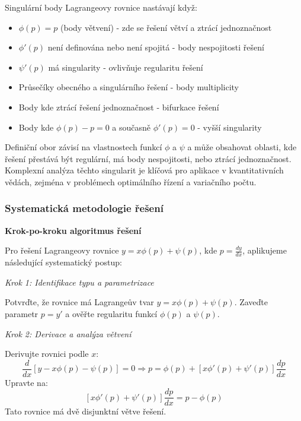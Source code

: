 Singulární body Lagrangeovy rovnice nastávají když:
\begin{itemize}
\item $\phi(p) = p$ (body větvení) - zde se řešení větví a ztrácí jednoznačnost
\item $\phi'(p)$ není definována nebo není spojitá - body nespojitosti řešení
\item $\psi'(p)$ má singularity - ovlivňuje regularitu řešení
\item Průsečíky obecného a singulárního řešení - body multiplicity
\item Body kde ztrácí řešení jednoznačnost - bifurkace řešení
\item Body kde $\phi(p) - p = 0$ a současně $\phi'(p) = 0$ - vyšší singularity
\end{itemize}

Definiční obor závisí na vlastnostech funkcí $\phi$ a $\psi$ a může obsahovat oblasti, kde řešení přestává být regulární, má body nespojitosti, nebo ztrácí jednoznačnost. Komplexní analýza těchto singularit je klíčová pro aplikace v kvantitativních vědách, zejména v problémech optimálního řízení a variačního počtu.

\subsubsection{Systematická metodologie řešení}
\label{subsubsec:metodologie-reseni-lagrange}

\noindent\textbf{Krok-po-kroku algoritmus řešení}

Pro řešení Lagrangeovy rovnice $y = x\phi(p) + \psi(p)$, kde $p = \frac{dy}{dx}$, aplikujeme následující systematický postup:

\vspace{1\baselineskip}

\noindent\textit{Krok 1: Identifikace typu a parametrizace}

Potvrďte, že rovnice má Lagrangeův tvar $y = x\phi(p) + \psi(p)$. Zaveďte parametr $p = y'$ a ověřte regularitu funkcí $\phi(p)$ a $\psi(p)$.

\vspace{1\baselineskip}

\noindent\textit{Krok 2: Derivace a analýza větvení}

Derivujte rovnici podle $x$:
\[
\frac{d}{dx}[y - x\phi(p) - \psi(p)] = 0 \Rightarrow p = \phi(p) + [x\phi'(p) + \psi'(p)]\frac{dp}{dx}
\]
Upravte na:
\[
[x\phi'(p) + \psi'(p)]\frac{dp}{dx} = p - \phi(p)
\]
Tato rovnice má dvě disjunktní větve řešení.


